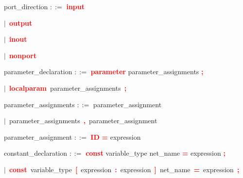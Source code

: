 \vspace{1em}
\noindent
\settowidth{\parindent}{\hspace{4ex}}
port\_direction $::=$\hspace{1ex} \textbf{\textcolor{red}{input}}

\mbox{$|$ \textbf{\textcolor{red}{output}}}

\mbox{$|$ \textbf{\textcolor{red}{inout}}}

\mbox{$|$ \textbf{\textcolor{red}{nonport}}}

\vspace{1em}
\noindent
\settowidth{\parindent}{\hspace{4ex}}

\vspace{1em}
\noindent
\settowidth{\parindent}{\hspace{4ex}}
parameter\_declaration $::=$\hspace{1ex} \textbf{\textcolor{red}{parameter}} parameter\_assignments \textbf{\textcolor{red}{;}}

\mbox{$|$ \textbf{\textcolor{red}{localparam}} parameter\_assignments \textbf{\textcolor{red}{;}}}

\vspace{1em}
\noindent
\settowidth{\parindent}{\hspace{4ex}}
parameter\_assignments $::=$\hspace{1ex} parameter\_assignment

\mbox{$|$ parameter\_assignments \textbf{\textcolor{red}{,}} parameter\_assignment}

\vspace{1em}
\noindent
\settowidth{\parindent}{\hspace{4ex}}
parameter\_assignment $::=$\hspace{1ex} \textbf{\textcolor{red}{ID}} \textbf{\textcolor{red}{=}} expression

\vspace{1em}
\noindent
\settowidth{\parindent}{\hspace{4ex}}
constant\_declaration $::=$\hspace{1ex} \textbf{\textcolor{red}{const}} variable\_type net\_name \textbf{\textcolor{red}{=}} expression \textbf{\textcolor{red}{;}}

\mbox{$|$ \textbf{\textcolor{red}{const}} variable\_type \textbf{\textcolor{red}{[}} expression \textbf{\textcolor{red}{:}} expression \textbf{\textcolor{red}{]}} net\_name \textbf{\textcolor{red}{=}} expression \textbf{\textcolor{red}{;}}}

